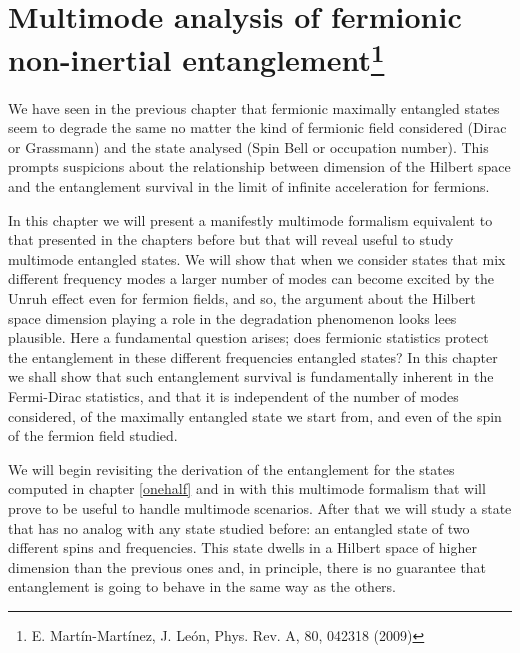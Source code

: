 

\chapter{Multimode analysis of fermionic non-inertial entanglement\footnote{E. Mart\'in-Mart\'inez, J. Le\'on, Phys. Rev. A, 80, 042318 (2009)}}\label{multimode}

We have seen in the previous chapter that fermionic maximally entangled states seem to degrade the same no matter the kind of fermionic field considered (Dirac or Grassmann) and the state analysed (Spin Bell or occupation number). This prompts suspicions about the relationship between dimension of the Hilbert space and the entanglement survival in the limit of infinite acceleration for fermions. 

In this chapter we will present a manifestly multimode formalism equivalent to that presented in the chapters before but that will reveal useful to study multimode entangled states. We will show that when we consider states that mix different frequency modes a larger number of modes can become excited by the Unruh effect even for fermion fields, and so, the argument about the Hilbert space dimension playing a role in the degradation phenomenon looks lees plausible. Here a fundamental question arises; does fermionic statistics protect the entanglement in these different frequencies entangled states? In this chapter we shall show that such entanglement survival is fundamentally inherent in the Fermi-Dirac statistics, and that it is independent of the number of modes considered, of the maximally entangled state we start from, and even of the spin of the fermion field studied.

We will begin revisiting the derivation of the entanglement for the states computed in chapter \ref{onehalf} and in \cite{AlsingSchul} with this multimode formalism that will prove to be useful to handle multimode scenarios. After that we will study a state that has no analog with any state studied before: an entangled state of two different spins and frequencies. This state dwells in a Hilbert space of higher dimension than the previous ones and, in principle, there is no guarantee that entanglement is going to behave in the same way as the others.

